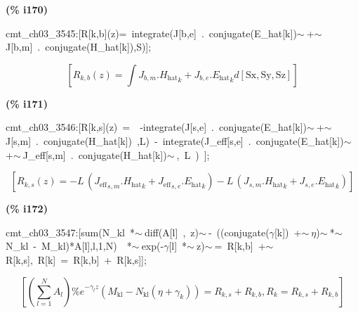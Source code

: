 \documentclass[fleqn]{article}
\begin{document}
\noindent
\begin{minipage}[t]{4.000000em}\color{red}\bfseries
(\% i170)	
\end{minipage}
\begin{minipage}[t]{\textwidth}\color{blue}
cmt\_ch03\_3545:[R[k,b](z)=\ integrate(J[b,e]\ .\ conjugate(E\_hat[k])\ensuremath{\sim\ }+\ensuremath{\sim\ }J[b,m]\ .\ conjugate(H\_hat[k]),S)];
\end{minipage}
\[\displaystyle \tag{cmt\_ ch03\_ 3545} 
\left[ {R_{k,b}}(z)=\int {\left. {J_{b,m}}\ensuremath{\mathrm{ . }}{{{H_{\ensuremath{\mathrm{hat}}}}}_k}+{J_{b,e}}\ensuremath{\mathrm{ . }}{{{E_{\ensuremath{\mathrm{hat}}}}}_k}d\left[ \ensuremath{\mathrm{Sx}}\operatorname{,}\ensuremath{\mathrm{Sy}}\operatorname{,}\ensuremath{\mathrm{Sz}}\right] \right.}\right] \mbox{}
\]


\noindent
\begin{minipage}[t]{4.000000em}\color{red}\bfseries
(\% i171)	
\end{minipage}
\begin{minipage}[t]{\textwidth}\color{blue}
cmt\_ch03\_3546:[R[k,s](z)\ =\ \ -integrate(J[s,e]\ .\ conjugate(E\_hat[k])\ensuremath{\sim\ }+\ensuremath{\sim\ }J[s,m]\ .\ conjugate(H\_hat[k])\ ,L)\ -\ integrate(J\_eff[s,e]\ .\ conjugate(E\_hat[k])\ensuremath{\sim\ }+\ensuremath{\sim\ }J\_eff[s,m]\ .\ conjugate(H\_hat[k])\ensuremath{\sim\ },\ L\ )\ ];
\end{minipage}
\[\displaystyle \tag{cmt\_ ch03\_ 3546} 
\left[ {R_{k,s}}(z)=-L\, \left( {{{J_{\ensuremath{\mathrm{eff}}}}}_{s,m}}\ensuremath{\mathrm{ . }}{{{H_{\ensuremath{\mathrm{hat}}}}}_k}+{{{J_{\ensuremath{\mathrm{eff}}}}}_{s,e}}\ensuremath{\mathrm{ . }}{{{E_{\ensuremath{\mathrm{hat}}}}}_k}\right) -L\, \left( {J_{s,m}}\ensuremath{\mathrm{ . }}{{{H_{\ensuremath{\mathrm{hat}}}}}_k}+{J_{s,e}}\ensuremath{\mathrm{ . }}{{{E_{\ensuremath{\mathrm{hat}}}}}_k}\right) \right] \mbox{}
\]


\noindent
\begin{minipage}[t]{4.000000em}\color{red}\bfseries
(\% i172)	
\end{minipage}
\begin{minipage}[t]{\textwidth}\color{blue}
cmt\_ch03\_3547:[sum(N\_kl\ *\ensuremath{\sim\ }diff(A[l]\ ,\ z)\ensuremath{\sim\ }-\ ((conjugate(\ensuremath{\gamma}[k])\ +\ensuremath{\sim\ }\ensuremath{\eta})\ensuremath{\sim\ }*\ensuremath{\sim\ }N\_kl\ -\ M\_kl)*A[l],l,1,N)\ \ *\ensuremath{\sim\ }exp(-\ensuremath{\gamma}[l]\ *\ensuremath{\sim\ }z)\ensuremath{\sim\ }=\ R[k,b]\ +\ensuremath{\sim\ }R[k,s],\ R[k]\ =\ R[k,b]\ +\ R[k,s]];
\end{minipage}
\[\displaystyle \tag{cmt\_ ch03\_ 3547} 
\left[ \left( \sum_{l=1}^{N}{\left. {A_l}\right.}\right)  {{\% e}^{-{{\gamma }_l} z}} \left( {M_{\ensuremath{\mathrm{kl}}}}-{N_{\ensuremath{\mathrm{kl}}}} \left( \eta +{{\gamma }_k}\right) \right) ={R_{k,s}}+{R_{k,b}}\operatorname{,}{R_k}={R_{k,s}}+{R_{k,b}}\right] \mbox{}
\]
\end{document}
